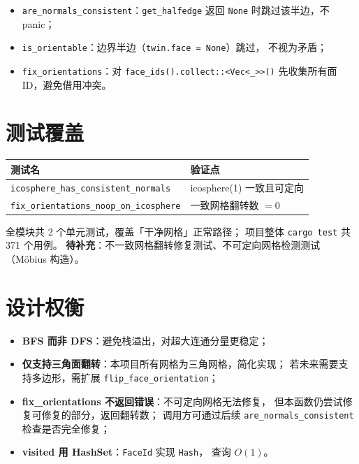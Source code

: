 \documentclass[11pt,a4paper]{article}
\begin{document}
\begin{itemize}
  \item \texttt{are\_normals\_consistent}：\texttt{get\_halfedge} 返回 \texttt{None}
        时跳过该半边，不 panic；
  \item \texttt{is\_orientable}：边界半边（\texttt{twin.face = None}）跳过，
        不视为矛盾；
  \item \texttt{fix\_orientations}：对 \texttt{face\_ids().collect::<Vec<\_>>()}
        先收集所有面 ID，避免借用冲突。
\end{itemize}

\section{测试覆盖}

\begin{center}
\renewcommand{\arraystretch}{1.18}
\begin{tabular}{@{}ll@{}}
  \toprule
  \textbf{测试名} & \textbf{验证点} \\
  \midrule
  \texttt{icosphere\_has\_consistent\_normals}    & icosphere(1) 一致且可定向 \\
  \texttt{fix\_orientations\_noop\_on\_icosphere} & 一致网格翻转数 $= 0$ \\
  \bottomrule
\end{tabular}
\end{center}

全模块共 2 个单元测试，覆盖「干净网格」正常路径；
项目整体 \texttt{cargo test} 共 371 个用例。
\textbf{待补充}：不一致网格翻转修复测试、不可定向网格检测测试（Möbius 构造）。

\section{设计权衡}

\begin{itemize}
  \item \textbf{BFS 而非 DFS}：避免栈溢出，对超大连通分量更稳定；
  \item \textbf{仅支持三角面翻转}：本项目所有网格为三角网格，简化实现；
        若未来需要支持多边形，需扩展 \texttt{flip\_face\_orientation}；
  \item \textbf{fix\_orientations 不返回错误}：不可定向网格无法修复，
        但本函数仍尝试修复可修复的部分，返回翻转数；
        调用方可通过后续 \texttt{are\_normals\_consistent} 检查是否完全修复；
  \item \textbf{visited 用 HashSet}：\texttt{FaceId} 实现 \texttt{Hash}，
        查询 $O(1)$。
\end{itemize}
\end{document}
